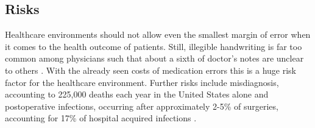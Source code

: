 \subsection{Risks}
Healthcare environments should not allow even the smallest margin of error when it comes to the health outcome of patients. Still, illegible handwriting is far too common among physicians such that about a sixth of doctor's notes are unclear to others \cite{rodriguez2002illegible}. With the already seen costs of medication errors this is a huge risk factor for the healthcare environment. Further risks include misdiagnosis, accounting to 225,000 deaths each year in the United States alone \cite{gregerIatrogenic} and postoperative infections, occurring after approximately 2-5\% of surgeries, accounting for 17\% of hospital acquired infections \cite{andreu2015wearable}.

